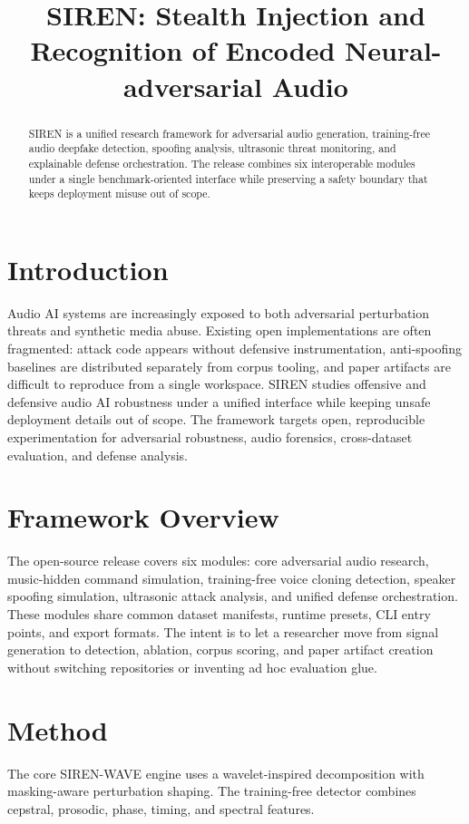 \documentclass[conference]{IEEEtran}
\title{SIREN: Stealth Injection and Recognition of Encoded Neural-adversarial Audio}
\author{\IEEEauthorblockN{George David Tsitlauri}
\IEEEauthorblockA{\textit{Dept. of Informatics \& Telecommunications}\\
\textit{University of Thessaly, Greece}\\
gdtsitlauri@gmail.com}}
\begin{document}
\maketitle

\begin{abstract}
SIREN is a unified research framework for adversarial audio generation, training-free audio deepfake detection, spoofing analysis, ultrasonic threat monitoring, and explainable defense orchestration. The release combines six interoperable modules under a single benchmark-oriented interface while preserving a safety boundary that keeps deployment misuse out of scope.
\end{abstract}

\section{Introduction}
Audio AI systems are increasingly exposed to both adversarial perturbation threats and synthetic media abuse. Existing open implementations are often fragmented: attack code appears without defensive instrumentation, anti-spoofing baselines are distributed separately from corpus tooling, and paper artifacts are difficult to reproduce from a single workspace. SIREN studies offensive and defensive audio AI robustness under a unified interface while keeping unsafe deployment details out of scope. The framework targets open, reproducible experimentation for adversarial robustness, audio forensics, cross-dataset evaluation, and defense analysis.

\section{Framework Overview}
The open-source release covers six modules: core adversarial audio research, music-hidden command simulation, training-free voice cloning detection, speaker spoofing simulation, ultrasonic attack analysis, and unified defense orchestration. These modules share common dataset manifests, runtime presets, CLI entry points, and export formats. The intent is to let a researcher move from signal generation to detection, ablation, corpus scoring, and paper artifact creation without switching repositories or inventing ad hoc evaluation glue.

\section{Method}
The core SIREN-WAVE engine uses a wavelet-inspired decomposition with masking-aware perturbation shaping. The training-free detector combines cepstral, prosodic, phase, timing, and spectral features.
\end{document}
